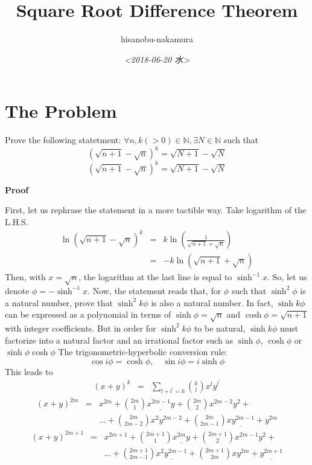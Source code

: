 \documentclass{article}
\author{hisanobu-nakamura}
\date{\textit{<2018-06-20 水>}}
\title{Square Root Difference Theorem}
\begin{document}
\maketitle



\section{The Problem}
\label{sec-1}
Prove the following statetment:
$\forall n, k (>0) \in \mathbb{N}, \exists N \in \mathbb{N}$ such that
\begin{equation}
  \label{eq:main}
  (\sqrt{n+1} - \sqrt{n})^k = \sqrt{N+1} -\sqrt{N}
\end{equation}
\begin{equation}
  \label{eq:main}
  (\sqrt{n+1} - \sqrt{n})^k = \sqrt{N+1} -\sqrt{N}
\end{equation}


\textbf{Proof}

First, let us rephrase the statement in a more tactible way. Take logarithm of the L.H.S.
\begin{eqnarray*}
\ln (\sqrt{n + 1} - \sqrt{n})^k &=& k \ln (\frac{1}{\sqrt{n + 1} + \sqrt{n}}) \\
&=& - k \ln (\sqrt{n + 1} + \sqrt{n})
\end{eqnarray*}
Then, with $x = \sqrt{n}$, the logarithm at the last line is equal to $\sinh^{-1}{x}$. So, let us denote $\phi = - \sinh^{-1}{x}$.
Now, the statement reads that, for $\phi$ such that $\sinh^2 \phi$ is a natural number, prove that $\sinh^2 k \phi$ is also a natural number.
In fact, $\sinh k \phi$ can be expressed as a polynomial in terms of $\sinh{\phi} = \sqrt{n}$ and $\cosh{\phi} = \sqrt{n + 1}$ with integer coefficients. 
But in order for $\sinh^2 k \phi$ to be natural, $\sinh k \phi$ must factorize into a natural factor and an irrational factor such as $\sinh{\phi}$, $\cosh{\phi}$ or $\sinh{\phi}\cosh{\phi}$
The trigonometric-hyperbolic conversion rule:
\begin{equation}
  \label{eq:trig-hype}
  \cos{i \phi} = \cosh{\phi}, \quad \sin{i \phi} = i \sinh{\phi} 
\end{equation}
This leads to
\begin{eqnarray}
  \label{eq:binomial}
  (x + y)^{k} &=& \sum_{l + l^{\prime} = k} \binom{k}{l} x^l y^{l^{\prime}}
\end{eqnarray}
\begin{eqnarray}
  \label{eq:binomial-even}
  (x + y)^{2m} &=& x ^{2m} + \binom{2m}{1} \underline{x^{2m-1}y} + \binom{2m}{2} x^{2m-2}y^2 + \nonumber \\
               && \dots + \binom{2m}{2m - 2} x^2 y^{2m-2} + \binom{2m}{2m - 1} \underline{x y^{2m-1}} + y^{2m}
\end{eqnarray}
\begin{eqnarray}
  \label{eq:binomial-odd}
  (x + y)^{2m+1} &=& x ^{2m+1} + \binom{2m+1}{1} \underline{x^{2m}y} + \binom{2m+1}{2} x^{2m-1}y^2 + \nonumber \\
  && \dots + \binom{2m + 1}{2m - 1} \underline{x^2 y^{2m-1}} + \binom{2m + 1}{2m} x y^{2m} + \underline{y^{2m+1}}
\end{eqnarray}
\end{document}
